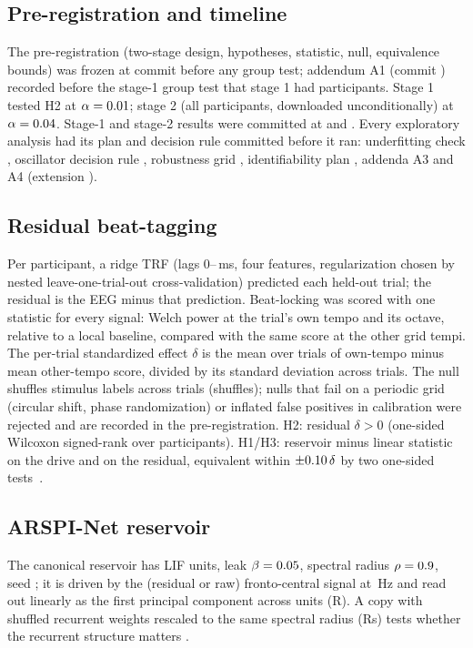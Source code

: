 \documentclass[journal]{IEEEtran}
\begin{document}
\subsection{Pre-registration and timeline}
The pre-registration (two-stage design, hypotheses, statistic, null, equivalence bounds) was frozen at commit \NumCommitPreregFreeze before any group test; addendum A1 (commit \NumCommitPreregAddendumAOne) recorded before the stage-1 group test that stage 1 had \NumNOne participants. Stage 1 tested H2 at $\alpha=0.01$; stage 2 (all \NumNTwo participants, downloaded unconditionally) at $\alpha=0.04$. Stage-1 and stage-2 results were committed at \NumCommitStageOne and \NumCommitStageTwo. Every exploratory analysis had its plan and decision rule committed before it ran: underfitting check \NumCommitUnderfitPlan, oscillator decision rule \NumCommitTheoryThreeRule, robustness grid \NumCommitRobustnessPlan, identifiability plan \NumCommitIdentPlan, addenda A3 \NumCommitIdentAThree and A4 \NumCommitIdentAFour (extension \NumCommitIdentAFourExt).

\subsection{Residual beat-tagging}
Per participant, a ridge TRF (lags 0--\NumTrfLagMax\,ms, four features, regularization chosen by nested leave-one-trial-out cross-validation) predicted each held-out trial; the residual is the EEG minus that prediction. Beat-locking was scored with one statistic for every signal: Welch power at the trial's own tempo and its octave, relative to a local baseline, compared with the same score at the other grid tempi. The per-trial standardized effect $\delta$ is the mean over trials of own-tempo minus mean other-tempo score, divided by its standard deviation across trials. The null shuffles stimulus labels across trials (\NumNShuffles shuffles); nulls that fail on a periodic grid (circular shift, phase randomization) or inflated false positives in calibration were rejected and are recorded in the pre-registration. H2: residual $\delta>0$ (one-sided Wilcoxon signed-rank over participants). H1/H3: reservoir minus linear statistic on the drive and on the residual, equivalent within $\pm0.10\,\delta$ by two one-sided tests~\cite{lakens2017equivalence}.

\subsection{ARSPI-Net reservoir}
The canonical reservoir has \NumResUnits LIF units, leak $\beta=0.05$, spectral radius $\rho=0.9$, seed \NumResSeed; it is driven by the (residual or raw) fronto-central signal at \NumFsRes\,Hz and read out linearly as the first principal component across units (R). A copy with shuffled recurrent weights rescaled to the same spectral radius (Rs) tests whether the recurrent structure matters \cite{verstraeten2007experimental,soures2019spiking,lane2024towards}.
\end{document}
